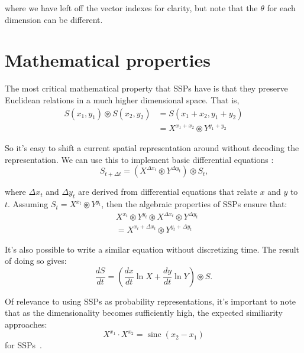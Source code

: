 \documentclass[10pt,letterpaper,oneside]{article}
\newcommand{\sinc}[1]{\operatorname{sinc}\left({#1}\right)}
\begin{document}
where we have left off the vector indexes for clarity, but note that the $\theta$ for each dimension can be different.

\section{Mathematical properties}

The most critical mathematical property that SSPs have is that they preserve Euclidean relations in a much higher dimensional space. That is, 
\begin{align}
   S(x_1,y_1) \circledast S(x_2,y_2) 
   &= S(x_1 + x_2,y_1 + y_2) \\
   &= X^{x_1 + x_2} \circledast Y^{y_1 + y_2}
\end{align}

So it's easy to shift a current spatial representation around without decoding the representation. We can use this to implement basic differential equations \cite{voelker2021a}:
\begin{equation} \label{eq:discrete-binding}
  S_{t + \Delta t} = \left ( X^{\Delta x_t} \circledast Y^{\Delta y_t} \right ) \circledast S_{t}  \text{,}
\end{equation}

where $\Delta x_t$ and $\Delta y_t$ are derived from differential equations that relate $x$ and $y$ to $t$. Assuming $ S_{t}=X^{x_t} \circledast Y^{y_t}$, then the algebraic properties of SSPs ensure that: 
\begin{align}
  & X^{x_t} \circledast Y^{y_t} \circledast X^{\Delta x_t} \circledast Y^{\Delta y_t} \\
  &= X^{x_t + \Delta x_t} \circledast Y^{y_t + \Delta y_t} 
\end{align}

It's also possible to write a similar equation without discretizing time. The result of doing so gives: 
\begin{equation} \label{eq:continuous-binding}
  \frac{d S }{dt} = \left( \frac{dx}{dt} \ln X + \frac{dy}{dt} \ln Y \right) \circledast S \text{.}
 \end{equation}

Of relevance to using SSPs as probability representations, it's important to note that as the dimensionality becomes sufficiently high, the expected similiarity approaches:
\begin{equation}
X^{x_1} \cdot X^{x_2} = \sinc{x_2 - x_1}
\end{equation}
for SSPs~\cite{voelker2020short}.
\end{document}

